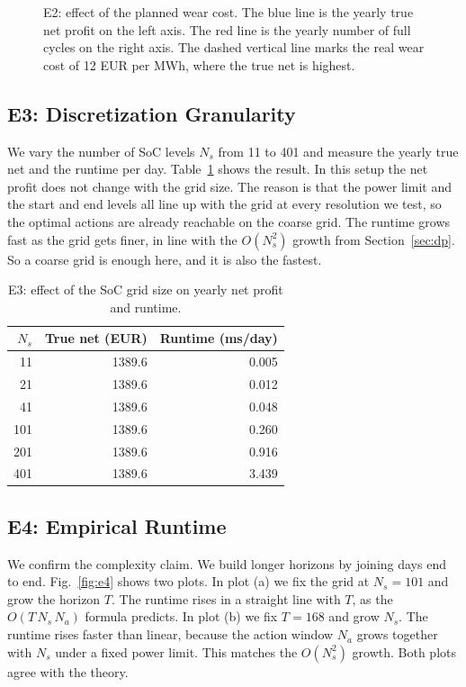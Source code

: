 \documentclass[conference,a4paper]{IEEEtran}
\begin{document}
\begin{figure}[t]
\centering

\caption{E2: effect of the planned wear cost. The blue line is the yearly
true net profit on the left axis. The red line is the yearly number of full
cycles on the right axis. The dashed vertical line marks the real wear cost of
12 EUR per MWh, where the true net is highest.}
\label{fig:e2}
\end{figure}

\subsection{E3: Discretization Granularity}
We vary the number of SoC levels $N_s$ from 11 to 401 and measure the yearly
true net and the runtime per day. Table~\ref{tab:e3} shows the result. In this
setup the net profit does not change with the grid size. The reason is that
the power limit and the start and end levels all line up with the grid at
every resolution we test, so the optimal actions are already reachable on the
coarse grid. The runtime grows fast as the grid gets finer, in line with the
$O(N_s^2)$ growth from Section~\ref{sec:dp}. So a coarse grid is enough here,
and it is also the fastest.

\begin{table}[t]
\caption{E3: effect of the SoC grid size on yearly net profit and runtime.}
\label{tab:e3}
\centering
\small
\begin{tabular}{rrr}
\toprule
$N_s$ & True net (EUR) & Runtime (ms/day)\\
\midrule
11  & 1389.6 & 0.005\\
21  & 1389.6 & 0.012\\
41  & 1389.6 & 0.048\\
101 & 1389.6 & 0.260\\
201 & 1389.6 & 0.916\\
401 & 1389.6 & 3.439\\
\bottomrule
\end{tabular}
\end{table}

\subsection{E4: Empirical Runtime}
We confirm the complexity claim. We build longer horizons by joining days end
to end. Fig.~\ref{fig:e4} shows two plots. In plot (a) we fix the grid at
$N_s=101$ and grow the horizon $T$. The runtime rises in a straight line with
$T$, as the $O(T\,N_s\,N_a)$ formula predicts. In plot (b) we fix $T=168$ and
grow $N_s$. The runtime rises faster than linear, because the action window
$N_a$ grows together with $N_s$ under a fixed power limit. This matches the
$O(N_s^2)$ growth. Both plots agree with the theory.
\end{document}
